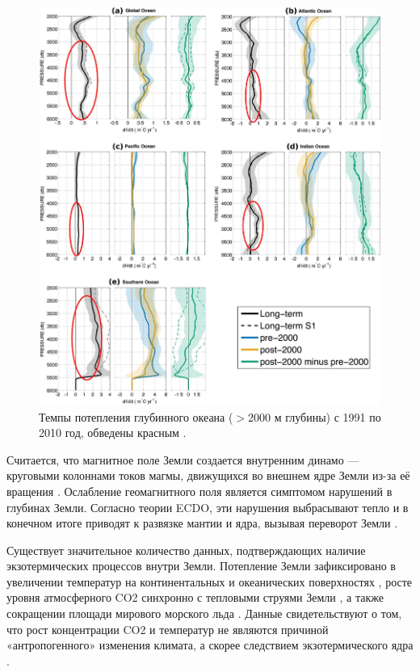 \documentclass[10pt,twocolumn,letterpaper]{article}
\begin{document}
\begin{figure}[t]
\begin{center}
   \includegraphics[width=1\linewidth]{ocean-highlight.jpg}
\end{center}
   \caption{Темпы потепления глубинного океана ($>$2000 м глубины) с 1991 по 2010 год, обведены красным \cite{132}.}
\label{fig:15}
\label{fig:onecol}
\end{figure}

Считается, что магнитное поле Земли создается внутренним динамо — круговыми колоннами токов магмы, движущихся во внешнем ядре Земли из-за её вращения \cite{123}. Ослабление геомагнитного поля является симптомом нарушений в глубинах Земли. Согласно теории ECDO, эти нарушения выбрасывают тепло и в конечном итоге приводят к развязке мантии и ядра, вызывая переворот Земли \cite{1}.

Существует значительное количество данных, подтверждающих наличие экзотермических процессов внутри Земли. Потепление Земли зафиксировано в увеличении температур на континентальных и океанических поверхностях \cite{127,128}, росте уровня атмосферного CO2 синхронно с тепловыми струями Земли \cite{129,130}, а также сокращении площади мирового морского льда \cite{131}. Данные свидетельствуют о том, что рост концентрации CO2 и температур не являются причиной «антропогенного» изменения климата, а скорее следствием экзотермического ядра \cite{129}.
\end{document}
